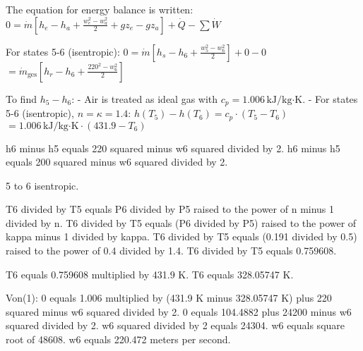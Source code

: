 The equation for energy balance is written:  
\( 0 = \dot{m} \left[ h_e - h_a + \frac{w_e^2 - w_a^2}{2} + g z_e - g z_a \right] + \dot{Q} - \sum \dot{W} \)  

For states 5-6 (isentropic):  
\( 0 = \dot{m} \left[ h_s - h_6 + \frac{w_5^2 - w_6^2}{2} \right] + 0 - 0 \)  
\( = \dot{m}_{\text{ges}} \left[ h_r - h_6 + \frac{220^2 - w_6^2}{2} \right] \)  

To find \( h_5 - h_6 \):  
- Air is treated as ideal gas with \( c_p = 1.006 \, \text{kJ/kg·K} \).  
- For states 5-6 (isentropic), \( n = \kappa = 1.4 \):  
\( h(T_5) - h(T_6) = c_p \cdot (T_5 - T_6) \)  
\( = 1.006 \, \text{kJ/kg·K} \cdot (431.9 - T_6) \)

h6 minus h5 equals 220 squared minus w6 squared divided by 2.  
h6 minus h5 equals 200 squared minus w6 squared divided by 2.  

5 to 6 isentropic.  

T6 divided by T5 equals P6 divided by P5 raised to the power of n minus 1 divided by n.  
T6 divided by T5 equals (P6 divided by P5) raised to the power of kappa minus 1 divided by kappa.  
T6 divided by T5 equals (0.191 divided by 0.5) raised to the power of 0.4 divided by 1.4.  
T6 divided by T5 equals 0.759608.  

T6 equals 0.759608 multiplied by 431.9 K.  
T6 equals 328.05747 K.  

Von(1):  
0 equals 1.006 multiplied by (431.9 K minus 328.05747 K) plus 220 squared minus w6 squared divided by 2.  
0 equals 104.4882 plus 24200 minus w6 squared divided by 2.  
w6 squared divided by 2 equals 24304.  
w6 equals square root of 48608.  
w6 equals 220.472 meters per second.